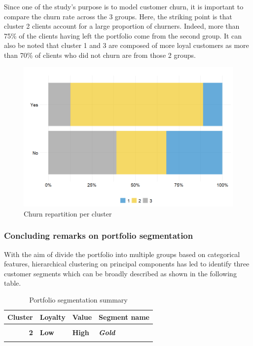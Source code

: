\documentclass[
]{book}
\begin{document}
Since one of the study's purpose is to model customer churn, it is important to compare the churn rate across the 3 groups. Here, the striking point is that cluster 2 clients account for a large proportion of churners. Indeed, more than 75\% of the clients having left the portfolio come from the second group. It can also be noted that cluster 1 and 3 are composed of more loyal customers as more than 70\% of clients who did not churn are from those 2 groups.

\begin{figure}

{\centering \includegraphics[width=0.6\linewidth,height=0.6\textheight]{./imgs/churn_cluster_barplot} 

}

\caption{Churn repartition per cluster}\label{fig:catvarsclust}
\end{figure}

\hypertarget{concluding-remarks-on-portfolio-segmentation}{%
\subsubsection*{Concluding remarks on portfolio segmentation}\label{concluding-remarks-on-portfolio-segmentation}}

With the aim of divide the portfolio into multiple groups based on categorical features, hierarchical clustering on principal components has led to identify three customer segments which can be broadly described as shown in the following table.

\begin{table}[H]

\caption{\label{tab:unnamed-chunk-24}Portfolio segmentation summary}
\centering
\begin{tabular}[t]{rll>{}l}
\toprule
Cluster & Loyalty & Value & Segment name\\
\midrule
\cellcolor{gray!6}{1} & \cellcolor{gray!6}{High} & \cellcolor{gray!6}{Low} & \em{\cellcolor{gray!6}{Silver}}\\
\textbf{2} & \textbf{Low} & \textbf{High} & \textbf{\em{Gold}}\\
\cellcolor{gray!6}{3} & \cellcolor{gray!6}{High} & \cellcolor{gray!6}{High} & \em{\cellcolor{gray!6}{Platinum}}\\
\bottomrule
\end{tabular}
\end{table}
\end{document}
